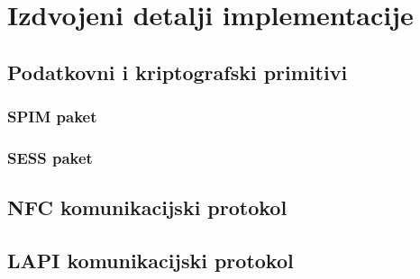 \chapter{Izdvojeni detalji implementacije}
\section{Podatkovni i kriptografski primitivi}
\subsection{SPIM paket}
\subsection{SESS paket}
\section{NFC komunikacijski protokol}
\section{LAPI komunikacijski protokol}